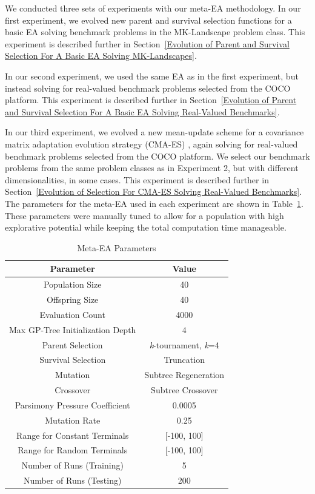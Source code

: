 \documentclass[times,12pt,titlepage]{mstogs}
\begin{document}
\begin{ThesisBody}
\label{Primary Experiments}

We conducted three sets of experiments with our meta-EA methodology. In our first experiment, we evolved new parent and survival selection functions for a basic EA solving benchmark problems in the MK-Landscape problem class. This experiment is described further in Section~\ref{Evolution of Parent and Survival Selection For A Basic EA Solving MK-Landscapes}.

In our second experiment, we used the same EA as in the first experiment, but instead solving for real-valued benchmark problems selected from the COCO platform. This experiment is described further in Section~\ref{Evolution of Parent and Survival Selection For A Basic EA Solving Real-Valued Benchmarks}.

In our third experiment, we evolved a new mean-update scheme for a covariance matrix adaptation evolution strategy (CMA-ES) \citep{hansen1996cmaes}, again solving for real-valued benchmark problems selected from the COCO platform. We select our benchmark problems from the same problem classes as in Experiment 2, but with different dimensionalities, in some cases. This experiment is described further in Section~\ref{Evolution of Selection For CMA-ES Solving Real-Valued Benchmarks}.
The parameters for the meta-EA used in each experiment are shown in Table~\ref{tab:Meta-EA Parameters}. These parameters were manually tuned to allow for a population with high explorative potential while keeping the total computation time manageable.

\begin{table}
\centering
  \caption{Meta-EA Parameters}
  \label{tab:Meta-EA Parameters}
  \begin{tabular}{c|c}
    \toprule
    Parameter& Value\\
    \midrule
    Population Size & 40 \\
    \hline
    Offspring Size & 40\\
    \hline
    Evaluation Count & 4000\\
    \hline
    Max GP-Tree Initialization Depth & 4\\
    \hline
    Parent Selection & \textit{k}-tournament, \textit{k}=4 \\
    \hline
    Survival Selection & Truncation\\
    \hline
    Mutation & Subtree Regeneration\\
    \hline
    Crossover & Subtree Crossover\\
    \hline
    Parsimony Pressure Coefficient & 0.0005\\
    \hline
    Mutation Rate & 0.25\\
    \hline
    Range for Constant Terminals & [-100, 100]\\
    \hline
    Range for Random Terminals & [-100, 100]\\
    \hline
    Number of Runs (Training) & 5 \\
    \hline
    Number of Runs (Testing) & 200\\
    

\end{tabular}
\end{table}
\end{ThesisBody}
\end{document}
